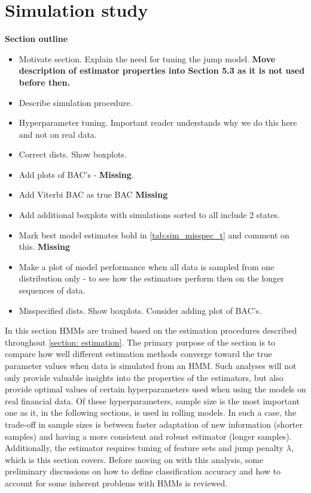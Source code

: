 \newpage

\section{Simulation study}
\label{Section: Simulation study}

\textbf{Section outline}
\begin{itemize}
    \item Motivate section. Explain the need for tuning the jump model. \textbf{Move description of estimator properties into Section 5.3 as it is not used before then.}
    \item Describe simulation procedure.
    \item Hyperparameter tuning. Important reader understands why we do this here and not on real data.
    \item Correct dists. Show boxplots. 
    \item Add plots of BAC's - \textbf{Missing}.
    \item Add Viterbi BAC as true BAC \textbf{Missing}
    \item Add additional boxplots with simulations sorted to all include 2 states.
    \item Mark best model estimates bold in \cref{tab:sim_misspec_t} and comment on this. \textbf{Missing}
    \item Make a plot of model performance when all data is sampled from one distribution only - to see how the estimators perform then on the longer sequences of data.
    \item Misspecified dists. Show boxplots. Consider adding plot of BAC's.
\end{itemize}

In this section HMMs are trained based on the estimation procedures described throughout \cref{section: estimation}. The primary purpose of the section is to compare how well different estimation methods converge toward the true parameter values when data is simulated from an HMM. Such analyses will not only provide valuable insights into the properties of the estimators, but also provide optimal values of certain hyperparameters used when using the models on real financial data. Of these hyperparameters, sample size is the most important one as it, in the following sections, is used in rolling models. In such a case, the trade-off in sample sizes is between faster adaptation of new information (shorter samples) and having a more consistent and robust estimator (longer samples). Additionally, the \jump estimator requires tuning of feature sets and jump penalty $\lambda$, which is this section covers. Before moving on with this analysis, some preliminary discussions on how to define classification accuracy and how to account for some inherent problems with HMMs is reviewed.

